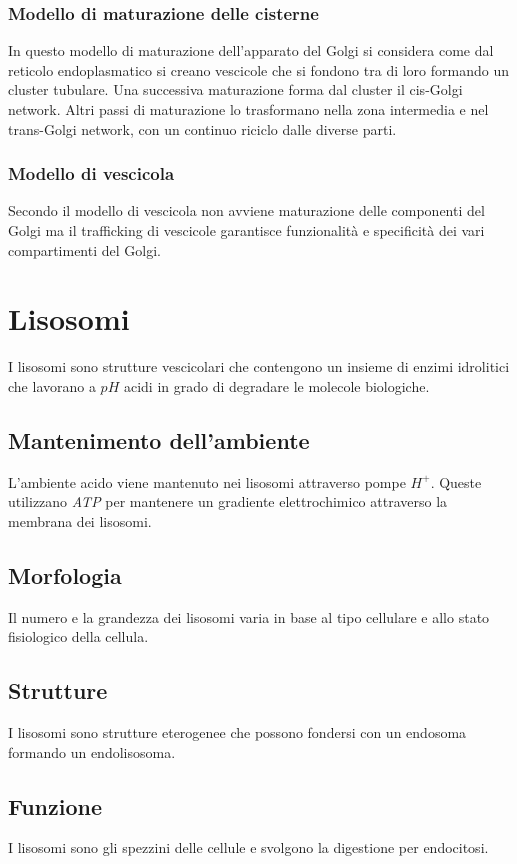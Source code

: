 		\subsubsection{Modello di maturazione delle cisterne}
		In questo modello di maturazione dell'apparato del Golgi si considera come dal reticolo endoplasmatico si creano vescicole che si fondono tra di loro formando un cluster tubulare.
		Una successiva maturazione forma dal cluster il cis-Golgi network.
		Altri passi di maturazione lo trasformano nella zona intermedia e nel trans-Golgi network, con un continuo riciclo dalle diverse parti.

		\subsubsection{Modello di vescicola}
		Secondo il modello di vescicola non avviene maturazione delle componenti del Golgi ma il trafficking di vescicole garantisce funzionalit\`a e specificit\`a dei vari compartimenti del Golgi.

\section{Lisosomi}
I lisosomi sono strutture vescicolari che contengono un insieme di enzimi idrolitici che lavorano a $pH$ acidi in grado di degradare le molecole biologiche.

	\subsection{Mantenimento dell'ambiente}
	L'ambiente acido viene mantenuto nei lisosomi attraverso pompe \emph{$H^+$}.
	Queste utilizzano \emph{ATP} per mantenere un gradiente elettrochimico attraverso la membrana dei lisosomi.

	\subsection{Morfologia}
	Il numero e la grandezza dei lisosomi varia in base al tipo cellulare e allo stato fisiologico della cellula.

	\subsection{Strutture}
	I lisosomi sono strutture eterogenee che possono fondersi con un endosoma formando un endolisosoma.

	\subsection{Funzione}
	I lisosomi sono gli spezzini delle cellule e svolgono la digestione per endocitosi.

